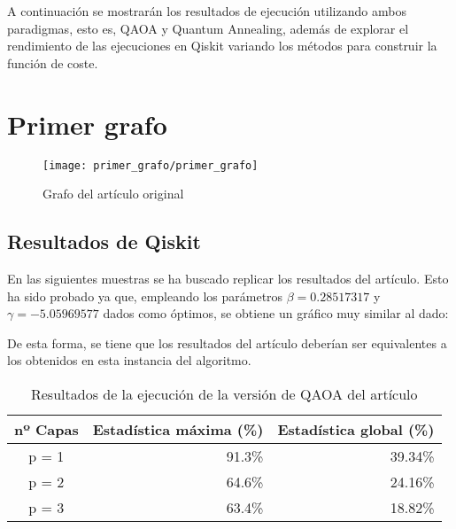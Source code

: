 \documentclass{article}
\begin{document}
A continuación se mostrarán los resultados de ejecución utilizando ambos paradigmas, esto es, QAOA y Quantum Annealing, además de explorar el rendimiento de las ejecuciones en Qiskit variando los métodos para construir la función de coste.

\newpage
\section{Primer grafo}
\label{sec:primer-grafo}

\begin{figure}[htbp]
  \centering
  \texttt{[image: primer\_grafo/primer\_grafo]}
  \caption{Grafo del artículo original} \label{fig:primer_grafo/primer_grafo}
\end{figure}

\subsection{Resultados de Qiskit}
\label{sec:resultados-de-qiskit}
En las siguientes muestras se ha buscado replicar los resultados del artículo. Esto ha sido probado ya que, empleando los parámetros \(\beta = 0.28517317\) y \(\gamma = -5.05969577 \) dados como óptimos, se obtiene un gráfico muy similar al dado: \\

\begin{figure}[htbp]
  \centering
  \caption{} \label{fig:primer_grafo/sin_restriccion_extra/primer_paper_aer_resultado}
\end{figure}

De esta forma, se tiene que los resultados del artículo deberían ser equivalentes a los obtenidos en esta instancia del algoritmo.

\begin{table}[htbp]
  \centering
  \begin{tabular}{|c|r|r|}
    \hline
    \textbf{nº Capas} & \textbf{Estadística máxima (\%)} & \textbf{Estadística global (\%)} \\ \hline
    p = 1 & 91.3\% & 39.34\% \\ \hline
    p = 2 & 64.6\% & 24.16\% \\ \hline
    p = 3 & 63.4\% & 18.82\% \\ \hline
  \end{tabular}
  \caption{Resultados de la ejecución de la versión de QAOA del artículo}
  \label{tab:primer_paper_aer_estadisticas}
\end{table}
\end{document}
